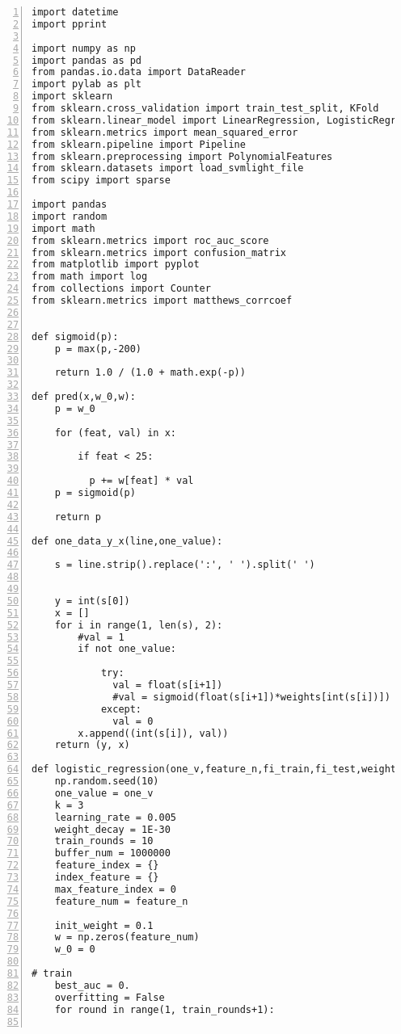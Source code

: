 \begin{lstlisting}[numbers=left, breaklines=true]
import datetime
import pprint

import numpy as np
import pandas as pd
from pandas.io.data import DataReader
import pylab as plt
import sklearn
from sklearn.cross_validation import train_test_split, KFold
from sklearn.linear_model import LinearRegression, LogisticRegression
from sklearn.metrics import mean_squared_error
from sklearn.pipeline import Pipeline
from sklearn.preprocessing import PolynomialFeatures
from sklearn.datasets import load_svmlight_file
from scipy import sparse

import pandas
import random
import math
from sklearn.metrics import roc_auc_score
from sklearn.metrics import confusion_matrix
from matplotlib import pyplot
from math import log
from collections import Counter
from sklearn.metrics import matthews_corrcoef


def sigmoid(p):
    p = max(p,-200)
    
    return 1.0 / (1.0 + math.exp(-p))

def pred(x,w_0,w):
    p = w_0
    
    for (feat, val) in x:
        
        if feat < 25:
          
          p += w[feat] * val 
    p = sigmoid(p)

    return p

def one_data_y_x(line,one_value):
    
    s = line.strip().replace(':', ' ').split(' ')

    
    y = int(s[0])
    x = []
    for i in range(1, len(s), 2):
        #val = 1
        if not one_value:
            
            try:
              val = float(s[i+1])
              #val = sigmoid(float(s[i+1])*weights[int(s[i])])
            except:
              val = 0
        x.append((int(s[i]), val))
    return (y, x)

def logistic_regression(one_v,feature_n,fi_train,fi_test,weights):
    np.random.seed(10)
    one_value = one_v
    k = 3
    learning_rate = 0.005
    weight_decay = 1E-30
    train_rounds = 10
    buffer_num = 1000000
    feature_index = {}
    index_feature = {}
    max_feature_index = 0
    feature_num = feature_n

    init_weight = 0.1
    w = np.zeros(feature_num)
    w_0 = 0

# train
    best_auc = 0.
    overfitting = False
    for round in range(1, train_rounds+1):
        

\end{lstlisting}
